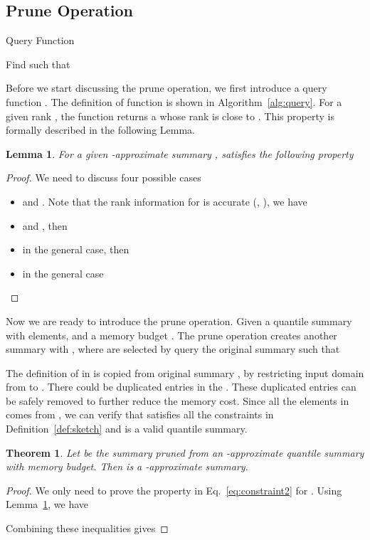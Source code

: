 \documentclass{sig-alternate-05-2015}
\newtheorem{thm:thm}{Theorem}[section]
\newtheorem{thm:lemma}{Lemma}[section]
\begin{document}
\subsection{Prune Operation}
\begin{algorithm}[t]
\caption{Query Function }\label{alg:query}
\KwIn{: }
\lIf{}{
    \Return 
}
\lIf{}{
    \Return 
}
Find  such that \\
\uIf{} {
    \Return 
}\Else{
    \Return 
}
\end{algorithm}
Before we start discussing the prune operation, we first introduce a query function . The definition of function is shown in Algorithm~\ref{alg:query}.
For a given rank , the function returns a  whose rank is close to . This property is formally described in the following Lemma.
\begin{thm:lemma}\label{lem:query}
For a given -approximate summary ,  satisfies the following property

\end{thm:lemma}
\begin{proof}
We need to discuss four possible cases
\begin{itemize}
\item  and . Note that the rank information for  is accurate
(, ), we have

\item  and , then

\item  in the general case, then

\item  in the general case

\end{itemize}
\end{proof}
Now we are ready to introduce the prune operation. Given a quantile summary  with  elements, and a memory budget . The prune operation creates another summary  with , where  are selected by query the original summary such that

The definition of  in  is copied from original summary , by restricting input domain from  to .
There could be duplicated entries in the . These duplicated entries can be safely removed to further reduce the memory cost.
Since all the elements in  comes from , we can verify that  satisfies all the constraints in Definition~\ref{def:sketch} and is a valid quantile summary.

\begin{thm:thm}
Let   be the summary pruned from  an -approximate quantile summary  with  memory budget.
 Then  is a -approximate summary.
\end{thm:thm}
\begin{proof}
We only need to prove the property in Eq.~\eqref{eq:constraint2} for .
Using Lemma~\ref{lem:query}, we have

Combining these inequalities gives

\end{proof}
\end{document}
